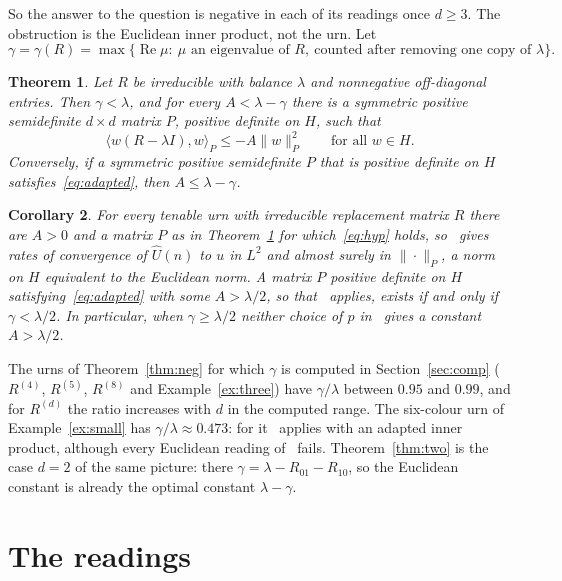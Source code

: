\documentclass[11pt]{amsart}
\newtheorem{theorem}{Theorem}[section]
\newtheorem{corollary}[theorem]{Corollary}
\theoremstyle{definition}
\theoremstyle{remark}
\DeclareMathOperator{\Real}{Re}
\begin{document}
So the answer to the question is negative in each of its readings once $d\ge3$. The obstruction is the Euclidean inner product, not the urn. Let
\[
\gamma=\gamma(R)=\max\{\Real\mu:\ \mu \text{ an eigenvalue of } R,\ \text{counted after removing one copy of }\lambda\}.
\]

\begin{theorem}\label{thm:adapted}
Let $R$ be irreducible with balance $\lambda$ and nonnegative off-diagonal entries. Then $\gamma<\lambda$, and for every $A<\lambda-\gamma$ there is a symmetric positive semidefinite $d\times d$ matrix $P$, positive definite on $H$, such that
\begin{equation}\label{eq:adapted}
\langle w(R-\lambda I),w\rangle_P\le -A\|w\|_P^2\qquad\text{for all }w\in H.
\end{equation}
Conversely, if a symmetric positive semidefinite $P$ that is positive definite on $H$ satisfies~\eqref{eq:adapted}, then $A\le\lambda-\gamma$.
\end{theorem}

\begin{corollary}\label{cor:rates}
For every tenable urn with irreducible replacement matrix $R$ there are $A>0$ and a matrix $P$ as in Theorem~\ref{thm:adapted} for which~\eqref{eq:hyp} holds, so~\cite[Theorem~3.2]{NP} gives rates of convergence of $\widehat U(n)$ to $u$ in $L^2$ and almost surely in $\|\cdot\|_P$, a norm on $H$ equivalent to the Euclidean norm. A matrix $P$ positive definite on $H$ satisfying~\eqref{eq:adapted} with some $A>\lambda/2$, so that~\cite[Theorem~3.3]{NP} applies, exists if and only if $\gamma<\lambda/2$. In particular, when $\gamma\ge\lambda/2$ neither choice of $p$ in~\cite[Proposition~3.6]{NP} gives a constant $A>\lambda/2$.
\end{corollary}

The urns of Theorem~\ref{thm:neg} for which $\gamma$ is computed in Section~\ref{sec:comp} ($R^{(4)}$, $R^{(5)}$, $R^{(8)}$ and Example~\ref{ex:three}) have $\gamma/\lambda$ between $0.95$ and $0.99$, and for $R^{(d)}$ the ratio increases with $d$ in the computed range. The six-colour urn of Example~\ref{ex:small} has $\gamma/\lambda\approx 0.473$: for it~\cite[Theorem~3.3]{NP} applies with an adapted inner product, although every Euclidean reading of~\cite[Proposition~3.6]{NP} fails. Theorem~\ref{thm:two} is the case $d=2$ of the same picture: there $\gamma=\lambda-R_{01}-R_{10}$, so the Euclidean constant is already the optimal constant $\lambda-\gamma$.

\section{The readings}\label{sec:readings}
\end{document}

